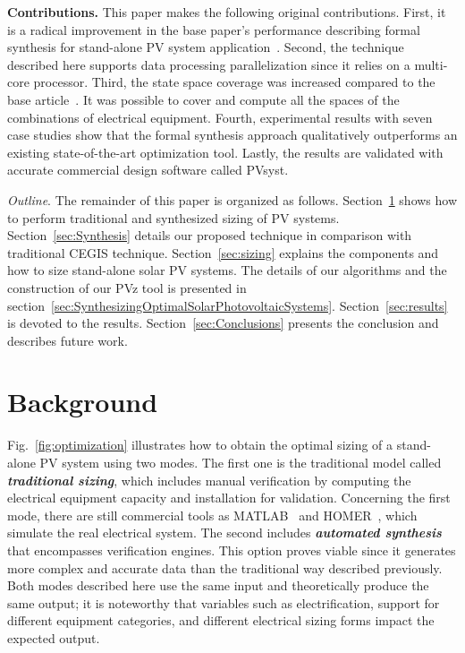 \documentclass[a4paper,donotrepeattitle,fleqn]{cas-dc}
\begin{document}
\noindent \textbf{Contributions.} This paper makes the following original contributions. First, it is a radical improvement in the base paper's performance describing formal synthesis for stand-alone PV system application~\cite{DBLP:journals/corr/abs-1909-13139}. Second, the technique described here supports data processing parallelization since it relies on a multi-core processor. Third, the state space coverage was increased compared to the base article~\cite{VSTTE2020}. It was possible to cover and compute all the spaces of the combinations of electrical equipment. Fourth, experimental results with seven case studies show that the formal synthesis approach qualitatively outperforms an existing state-of-the-art optimization tool. Lastly, the results are validated with accurate commercial design software called PVsyst.

\noindent \textit{Outline}. The remainder of this paper is organized as follows. Section~\ref{sec:Background} shows how to perform traditional and synthesized sizing of PV systems. Section~\ref{sec:Synthesis} details our proposed technique in comparison with traditional CEGIS technique. Section~\ref{sec:sizing} explains the components and how to size stand-alone solar PV systems. The details of our algorithms and the construction of our PVz tool is presented in section~\ref{sec:SynthesizingOptimalSolarPhotovoltaicSystems}. Section~\ref{sec:results} is devoted to the results. Section~\ref{sec:Conclusions} presents the conclusion and describes future work.

\section{Background}
\label{sec:Background}
Fig.~\ref{fig:optimization} illustrates how to obtain the optimal sizing of a stand-alone PV system using two modes. The first one is the traditional model called \textit{\textbf{traditional sizing}}, which includes manual verification by computing the electrical equipment capacity and installation for validation. Concerning the first mode, there are still commercial tools as MATLAB~\cite{Benatiallah2017} and HOMER~\cite{Pradhan,Swarnkar}, which simulate the real electrical system. The second includes \textbf{\textit{automated synthesis}} that encompasses verification engines. This option proves viable since it generates more complex and accurate data than the traditional way described previously. Both modes described here use the same input and theoretically produce the same output; it is noteworthy that variables such as electrification, support for different equipment categories, and different electrical sizing forms impact the expected output.
\end{document}
